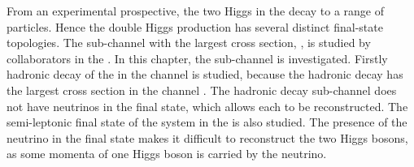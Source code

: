 


From an experimental prospective, the two Higgs in the  \eeToHH decay to a range of particles. Hence the double Higgs production has several distinct final-state topologies. The sub-channel with the largest cross section, \eeToHHbbbb, is studied by  collaborators in the \CERN. In this chapter, the \eeToHHbbWW sub-channel  is investigated. Firstly hadronic decay of the \WW in the \eeToHHbbWW channel is studied, because the hadronic decay has the largest cross section  in the \eeToHHbbWW channel . The hadronic decay sub-channel  does not have   neutrinos in the final state, which allows each \PW to be reconstructed. The semi-leptonic final state of the \WW system in the \eeToHHbbWW is also studied. The presence of the neutrino in the final state makes it  difficult to reconstruct the two Higgs bosons, as some momenta of one Higgs boson is carried by the neutrino. %




